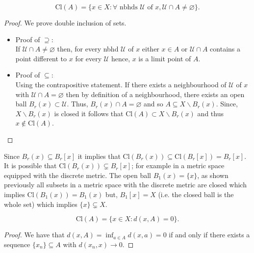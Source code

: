 \documentclass[12pt, a4paper]{article}
\newcommand{\UU}{\mathcal U}
\begin{document}
\begin{mdcor}
    \[\text{Cl}(A) = \{x \in X : \forall \text{ nbhds } \mathcal{U} \text{ of } x, \mathcal{U} \cap A \neq \varnothing\}.\]
\end{mdcor}

\begin{proof}
    We prove double inclusion of sets.
    \begin{itemize}
        \item Proof of \(\supseteq\): \\
        If \(\UU \cap A \neq \varnothing\) then, for every nbhd \(\UU\) of \(x\) either \(x \in A\) or \(\UU \cap A\) contains a point different to \(x\) for every \(\UU\) hence, \(x\) is a limit point of \(A\).
        \item Proof of \(\subseteq\): \\
        Using the contrapositive statement. If there exists a neighbourhood of \(\mathcal{U}\) of \(x\) with \(\mathcal{U} \cap A = \varnothing\) then by definition of a neighbourhood, there exists an open ball \(B_r(x) \subset \mathcal{U}\). Thus, \(B_r(x) \cap A = \varnothing\) and so \(A \subseteq X \backslash B_r(x)\). Since, \(X \backslash B_r(x)\) is closed it follows that \(\text{Cl}(A) \subset X \backslash B_r(x)\) and thus \(x \not\in \text{Cl}(A)\).
    \end{itemize}
\end{proof}

\begin{mdremark}
    Since \(B_r(x) \subseteq B_r[x]\) it implies that \(\text{Cl}(B_r(x)) \subseteq \text{Cl}(B_r[x]) = B_r[x]\). \\
    It is possible that \(\text{Cl}(B_r(x)) \subsetneq B_r[x]\); for example in a metric space equipped with the discrete metric. The open ball \(B_1(x) = \{x\}\), as shown previously all subsets in a metric space with the discrete metric are closed which implies \(\text{Cl}(B_1(x))= B_1(x)\) but, \(B_1[x] = X\) (i.e. the closed ball is the whole set) which implies \(\{x\} \subsetneq X\).
\end{mdremark}

\begin{mdcor}
    \[\text{Cl}(A) = \{x \in X: d(x,A)=0\}.\]
\end{mdcor}

\begin{proof}
    We have that \(d(x,A)=\inf_{a\in A} d(x,a) =0\) if and only if there exists a sequence \(\{x_n\} \subseteq A\) with \(d(x_n,x) \to 0\).
\end{proof}
\end{document}
